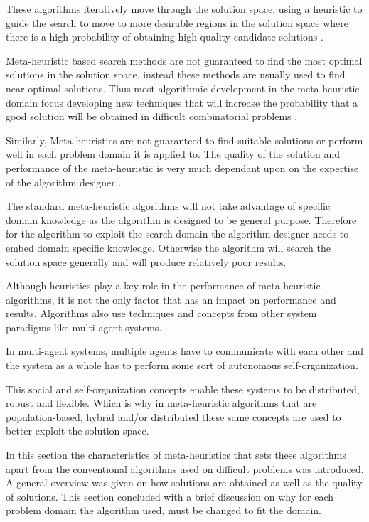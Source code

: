 These algorithms iteratively move through the solution space, using a heuristic to guide the search to move to more desirable regions in the solution space where there is a high probability of obtaining high quality candidate solutions \cite{TabuMontemanniSmith,SweepMeta}.

Meta-heuristic based search methods are not guaranteed to find the most optimal solutions in the solution space, instead these methods are usually used to find near-optimal solutions. Thus most algorithmic development in the meta-heuristic domain focus developing new techniques that will increase the probability that a good solution will be obtained in difficult combinatorial problems \cite{MetaAgricultural}.

Similarly, Meta-heuristics are not guaranteed to find suitable solutions or perform well in each problem domain it is applied to. The quality of the solution and performance of the meta-heuristic is very much dependant upon on the expertise of the algorithm designer \cite{AutoComplexMeta}. 

The standard meta-heuristic algorithms will not take advantage of specific domain knowledge as the algorithm is designed to be general purpose. Therefore for the algorithm to exploit the search domain the algorithm designer needs to embed domain specific knowledge\cite{AutoComplexMeta,AIModernApproach}. Otherwise the algorithm will search the solution space generally and will produce relatively poor results\cite{AutoComplexMeta,AIModernApproach}.

Although heuristics play a key role in the performance of meta-heuristic algorithms, it is not the only factor that has an impact on performance and results. Algorithms also use techniques and concepts from other system paradigms like multi-agent systems\cite{Self-AdaptiveMeta}. 

In multi-agent systems, multiple agents have to communicate with each other and the system as a whole has to perform some sort of autonomous self-organization\cite{Self-AdaptiveMeta}.

This social and self-organization concepts enable these systems to be distributed, robust and flexible. Which is why in meta-heuristic algorithms that are population-based, hybrid and/or distributed these same concepts are used to better exploit the solution space\cite{Self-AdaptiveMeta}.

In this section the characteristics of meta-heuristics that sets these algorithms apart from the conventional algorithms used on difficult problems was introduced. A general overview was given on how solutions are obtained as well as the quality of solutions. This section concluded with a brief discussion on why for each problem domain the algorithm used, must be changed to fit the domain. 

